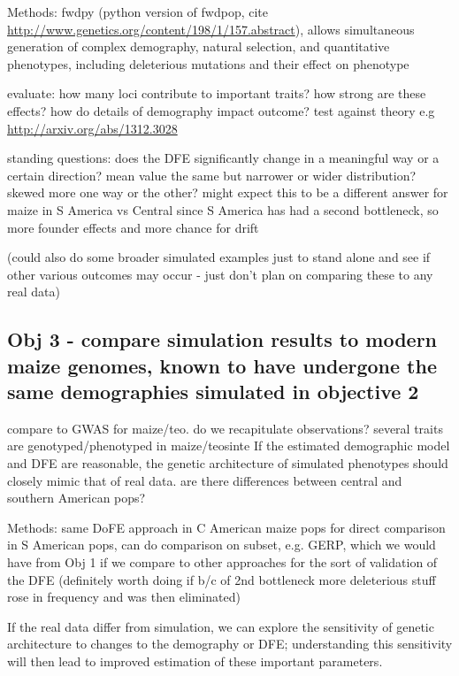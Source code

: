 	Methods: fwdpy (python version of fwdpop, cite \url{http://www.genetics.org/content/198/1/157.abstract}), allows simultaneous generation of complex demography, natural selection, and quantitative phenotypes, including deleterious mutations and their effect on phenotype
	
	evaluate:
		how many loci contribute to important traits?
		how strong are these effects?
		how do details of demography impact outcome?
		test against theory e.g \url{http://arxiv.org/abs/1312.3028}
	
	standing questions:
		does the DFE significantly change in a meaningful way or a certain direction?
			mean value the same but narrower or wider distribution?
			skewed more one way or the other?
		might expect this to be a different answer for maize in S America vs Central since S America has had a second bottleneck, so more founder effects and more chance for drift
	
	(could also do some broader simulated examples just to stand alone and see if other various outcomes may occur - just don't plan on comparing these to any real data)

\subsection{Obj 3 - compare simulation results to modern maize genomes, known to have undergone the same demographies simulated in objective 2}%
	compare to GWAS for maize/teo. do we recapitulate observations?
		several traits are genotyped/phenotyped in maize/teosinte
		If the estimated demographic model and DFE are reasonable, the genetic architecture of simulated phenotypes should closely mimic that of real data.
	are there differences between central and southern American pops? 
	
	Methods: same DoFE approach in C American maize pops for direct comparison
		in S American pops, can do comparison on subset, e.g. GERP, which we would have from Obj 1 if we compare to other approaches for the sort of validation of the DFE
			(definitely worth doing if b/c of 2nd bottleneck more deleterious stuff rose in frequency and was then eliminated)

	If the real data differ from simulation, we can explore the sensitivity of genetic architecture to changes to the demography or DFE; understanding this sensitivity will then lead to improved estimation of these important parameters.

